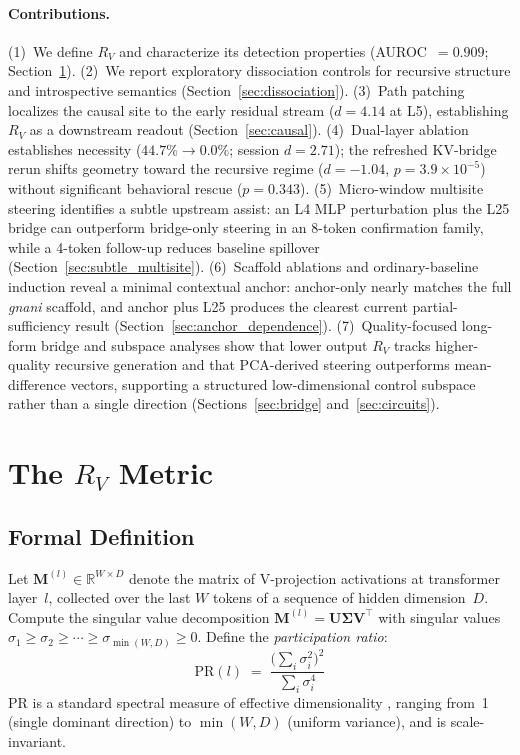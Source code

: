 \documentclass{article}
\newcommand{\RV}{R_V}
\newcommand{\PR}{\text{PR}}
\newcommand{\dcohen}{d}
\begin{document}
\paragraph{Contributions.}
(1)~We define $\RV$ and characterize its detection properties (AUROC~$= 0.909$;
Section~\ref{sec:metric}).
(2)~We report exploratory dissociation controls for recursive structure and introspective semantics
(Section~\ref{sec:dissociation}).
(3)~Path patching localizes the causal site to the early residual stream ($\dcohen = 4.14$ at L5),
establishing $\RV$ as a downstream readout (Section~\ref{sec:causal}).
(4)~Dual-layer ablation establishes necessity ($44.7\% \to 0.0\%$; session $\dcohen = 2.71$);
the refreshed KV-bridge rerun shifts geometry toward the recursive regime
($\dcohen = -1.04$, $p = 3.9 \times 10^{-5}$) without significant behavioral rescue
($p = 0.343$).
(5)~Micro-window multisite steering identifies a subtle upstream assist:
an L4 MLP perturbation plus the L25 bridge can outperform bridge-only steering in an
8-token confirmation family, while a 4-token follow-up reduces baseline spillover
(Section~\ref{sec:subtle_multisite}).
(6)~Scaffold ablations and ordinary-baseline induction reveal a minimal contextual anchor:
anchor-only nearly matches the full \emph{gnani} scaffold, and anchor plus L25 produces the clearest
current partial-sufficiency result (Section~\ref{sec:anchor_dependence}).
(7)~Quality-focused long-form bridge and subspace analyses show that lower output $\RV$ tracks
higher-quality recursive generation and that PCA-derived steering outperforms mean-difference
vectors, supporting a structured low-dimensional control subspace rather than a single direction
(Sections~\ref{sec:bridge} and~\ref{sec:circuits}).


\section{The $\RV$ Metric}
\label{sec:metric}

\subsection{Formal Definition}

Let $\mathbf{M}^{(l)} \in \mathbb{R}^{W \times D}$ denote the matrix of V-projection activations at
transformer layer~$l$, collected over the last $W$ tokens of a sequence of hidden dimension~$D$.
Compute the singular value decomposition $\mathbf{M}^{(l)} = \mathbf{U} \boldsymbol{\Sigma} \mathbf{V}^\top$
with singular values $\sigma_1 \geq \sigma_2 \geq \cdots \geq \sigma_{\min(W,D)} \geq 0$.
Define the \emph{participation ratio}:
\begin{equation}
    \PR(l) \;=\; \frac{\bigl(\sum_i \sigma_i^2\bigr)^2}{\sum_i \sigma_i^4}
    \label{eq:pr}
\end{equation}
$\PR$ is a standard spectral measure of effective dimensionality \citep{gao2017theory,
roy2007effective}, ranging from~1 (single dominant direction) to $\min(W, D)$ (uniform variance),
and is scale-invariant.
\end{document}
